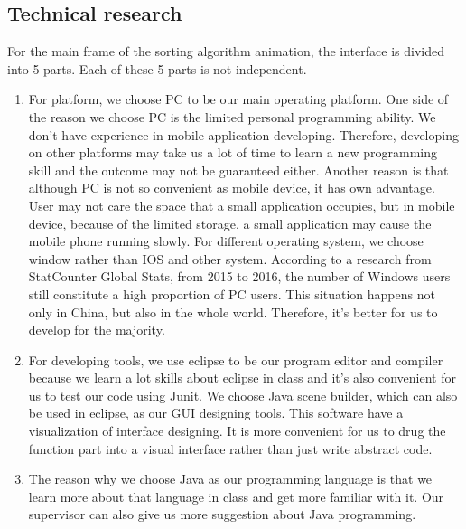 \documentclass[paper=a4, fontsize=11pt,twoside]{scrartcl}		%
\begin{document}
\subsection{Technical research}
For the main frame of the sorting algorithm animation, the interface is divided into 5 parts. Each of these 5 parts is not independent. 
\begin{enumerate}
	\item For platform, we choose PC to be our main operating platform. One side of the reason we choose PC is the limited personal programming ability. We don’t have experience in mobile application developing. Therefore, developing on other platforms may take us a lot of time to learn a new programming skill and the outcome may not be guaranteed either. Another reason is that although PC is not so convenient as mobile device, it has own advantage. User may not care the space that a small application occupies, but in mobile device, because of the limited storage, a small application may cause the mobile phone running slowly. For different operating system, we choose window rather than IOS and other system. According to a research from StatCounter Global Stats, from 2015 to 2016, the number of Windows users still constitute a high proportion of PC users. This situation happens not only in China, but also in the whole world. Therefore, it’s better for us to develop for the majority.
	\item For developing tools, we use eclipse to be our program editor and compiler because we learn a lot skills about eclipse in class and it’s also convenient for us to test our code using Junit. We choose Java scene builder, which can also be used in eclipse, as our GUI designing tools. This software have a visualization of interface designing. It is more convenient for us to drug the function part into a visual interface rather than just write abstract code. 
	\item The reason why we choose Java as our programming language is that we learn more about that language in class and get more familiar with it. Our supervisor can also give us more suggestion about Java programming. 
	
\end{enumerate}


\end{document}
